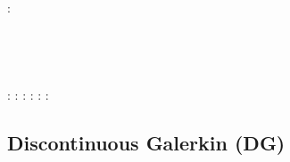 \begin{scriptsize}
\cite{fesw12} \cite{fesw12}\\
\cite{simj12} \cite{simj12}\\
\cite{beck12} \cite{beck12}\\
\cite{pahk12} \cite{pahk12}\\
\cite{sabt12} \cite{sabt12}\\
\cite{sakm12} \cite{sakm12}\\
\cite{mapl12} \cite{mapl12}\\
\cite{jawp12} \cite{jawp12}\\
\cite{hick12} \cite{hick12}\\
\twothousandthirteen: 
\cite{ress13} \cite{ress13}\\
\cite{ebbf13} \cite{ebbf13}\\
\cite{davi13} \cite{davi13}\\
\cite{scle13} \cite{scle13}\\
\cite{waja13} \cite{waja13}\\
\twothousandfourteen: 
\cite{paml14}
\cite{ebbf14}
\cite{krbk14}
\cite{licl14}
\cite{aubb14} 
\cite{cako14} 
\cite{scwr14}
\twothousandfifteen: 
\cite{boem15} 
\cite{brrs15} 
\cite{furc15} 
\cite{pabb15}
\cite{manp15} 
\cite{fepg15} 
\cite{vapb15}
\cite{resa15}
\twothousandsixteen: 
\cite{kord16}
\cite{rond16}
\cite{duti16}
\cite{cogb16}
\twothousandseventeen: 
\cite{roev17}
\twothousandeighteen: 
\cite{pabn18}
\cite{hamp18}
\cite{rihc18}
\twothousandnineteen: 
\cite{sopg19} 
\cite{shar19} 
\cite{afss19} 
\cite{sacm19} 
\cite{szae19}
\end{scriptsize}



\subsection{Discontinuous Galerkin (DG)}

